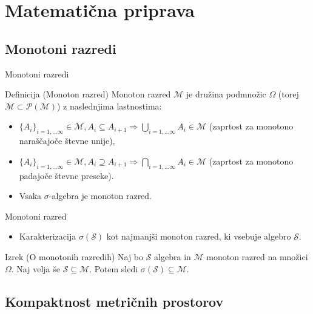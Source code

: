 \documentclass{beamer}
\begin{document}
\section{Matematična priprava}

\subsection{Monotoni razredi}

\begin{frame}{Monotoni razredi}
\begin{block}{Definicija (Monoton razred)}
Monoton razred $\mathcal{M}$ je družina podmnožic $\Omega$ (torej $\mathcal{M} \subset \mathcal{P(\mathcal{M})}$) z naslednjima lastnostima:
\begin{itemize}
\item  $\{A_i\}_{i=1,...\infty} \in \mathcal{M}, A_i \subseteq A_{i+1} \Rightarrow \bigcup_{i=1,...\infty} A_i \in \mathcal{M}$ (zaprtost za monotono naraščajoče števne unije),
\item  $\{A_i\}_{i=1,...\infty} \in \mathcal{M}, A_i \supseteq A_{i+1} \Rightarrow \bigcap_{i=1,...\infty} A_i \in \mathcal{M}$ (zaprtost za monotono padajoče števne preseke).
\end{itemize}
\end{block}
\begin{itemize}
\item Vsaka $\sigma$-algebra je monoton razred.
\end{itemize}
\end{frame}

\begin{frame}{Monotoni razred}
\begin{itemize}
\item Karakterizacija $\sigma(\mathcal{S})$ kot najmanjši monoton razred, ki vsebuje algebro $\mathcal{S}$.
\end{itemize}
\begin{block}{Izrek (O monotonih razredih)}
Naj bo $\mathcal{S}$ algebra in $\mathcal{M}$ monoton razred na množici $\Omega$. Naj velja še $\mathcal{S} \subseteq \mathcal{M}$. Potem sledi $\sigma{(\mathcal{S})} \subseteq \mathcal{M}$.
\end{block}
\end{frame}

\subsection{Kompaktnost metričnih prostorov}
\end{document}
